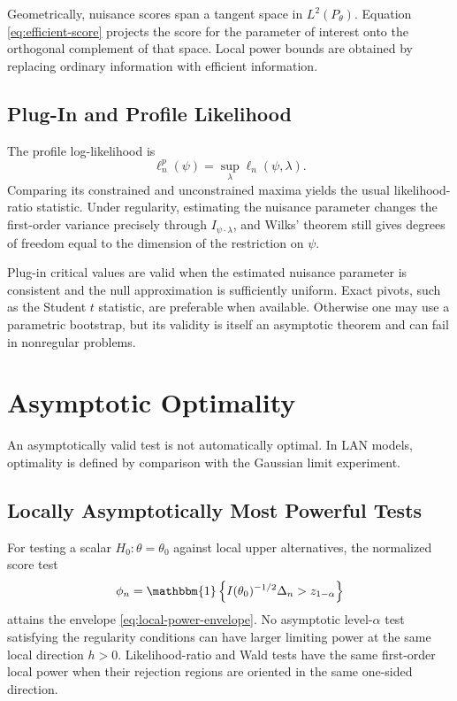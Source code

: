 \documentclass[12pt,oneside]{book}
\numberwithin{equation}{section}
\theoremstyle{definition}
\theoremstyle{plain}
\theoremstyle{remark}
\newcommand{\ind}{\mathbbm{1}}
\begin{document}
Geometrically, nuisance scores span a tangent space in $L^2(P_\theta)$.
Equation \eqref{eq:efficient-score} projects the score for the parameter of
interest onto the orthogonal complement of that space.  Local power bounds
are obtained by replacing ordinary information with efficient information.

\subsection{Plug-In and Profile Likelihood}

The profile log-likelihood is
\[
    \ell_n^p(\psi)=\sup_\lambda\ell_n(\psi,\lambda).
\]
Comparing its constrained and unconstrained maxima yields the usual
likelihood-ratio statistic.  Under regularity, estimating the nuisance
parameter changes the first-order variance precisely through
$I_{\psi\cdot\lambda}$, and Wilks' theorem still gives degrees of freedom equal
to the dimension of the restriction on $\psi$.

Plug-in critical values are valid when the estimated nuisance parameter is
consistent and the null approximation is sufficiently uniform.  Exact
pivots, such as the Student $t$ statistic, are preferable when available.
Otherwise one may use a parametric bootstrap, but its validity is itself an
asymptotic theorem and can fail in nonregular problems.

\section{Asymptotic Optimality}

An asymptotically valid test is not automatically optimal.  In LAN models,
optimality is defined by comparison with the Gaussian limit experiment.

\subsection{Locally Asymptotically Most Powerful Tests}

For testing a scalar $H_0:\theta=\theta_0$ against local upper alternatives,
the normalized score test
\[
    \phi_n=\ind\left\{
      I(\theta_0)^{-1/2}\Delta_n>z_{1-\alpha}
    \right\}
\]
attains the envelope \eqref{eq:local-power-envelope}.  No asymptotic
level-$\alpha$ test satisfying the regularity conditions can have larger
limiting power at the same local direction $h>0$.  Likelihood-ratio and Wald
tests have the same first-order local power when their rejection regions are
oriented in the same one-sided direction.
\end{document}
